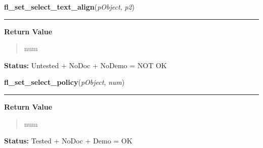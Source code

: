     \label{xformslib:library:fl_set_select_text_align}

    \vspace{0.5ex}

\hspace{.8\funcindent}\begin{boxedminipage}{\funcwidth}

    \raggedright \textbf{fl\_set\_select\_text\_align}(\textit{pObject}, \textit{p2})

    \vspace{-1.5ex}

    \rule{\textwidth}{0.5\fboxrule}
\setlength{\parskip}{2ex}
\setlength{\parskip}{1ex}
      \textbf{Return Value}
    \vspace{-1ex}

      \begin{quote}
      num

      \end{quote}

\textbf{Status:} Untested + NoDoc + NoDemo = NOT OK



    \end{boxedminipage}

    \label{xformslib:library:fl_set_select_policy}

    \vspace{0.5ex}

\hspace{.8\funcindent}\begin{boxedminipage}{\funcwidth}

    \raggedright \textbf{fl\_set\_select\_policy}(\textit{pObject}, \textit{num})

    \vspace{-1.5ex}

    \rule{\textwidth}{0.5\fboxrule}
\setlength{\parskip}{2ex}
\setlength{\parskip}{1ex}
      \textbf{Return Value}
    \vspace{-1ex}

      \begin{quote}
      num

      \end{quote}

\textbf{Status:} Tested + NoDoc + Demo = OK



    \end{boxedminipage}

